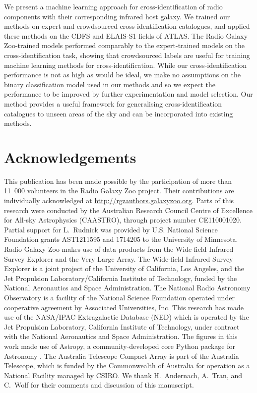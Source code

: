 \documentclass[fleqn,usenatbib,usedcolumn]{mnras}
\begin{document}
  We present a machine learning approach for cross-identification of radio
  components with their corresponding infrared host galaxy. We trained our
  methods on expert and crowdsourced cross-identification catalogues, and
  applied these methods on the CDFS and ELAIS-S1 fields of ATLAS. The Radio
  Galaxy Zoo-trained models performed comparably to the expert-trained models
  on the cross-identification task, showing that crowdsourced labels are
  useful for training machine learning methods for cross-identification. While
  our cross-identification performance is not as high as would be ideal, we
  make no assumptions on the binary classification model used in our methods
  and so we expect the performance to be improved by further experimentation
  and model selection. Our method provides a useful framework for generalising
  cross-identification catalogues to unseen areas of the sky and can be
  incorporated into existing methods.

\section{Acknowledgements}

  This publication has been made possible by the participation of more than 11~000 volunteers in the Radio Galaxy Zoo project. Their contributions are individually acknowledged at \url{http://rgzauthors.galaxyzoo.org}. Parts of this research were conducted by the Australian Research Council Centre of Excellence for All-sky Astrophysics (CAASTRO), through project number CE110001020. Partial support for L.~Rudnick was provided by U.S. National Science Foundation grants AST1211595 and 1714205 to the University of Minnesota. Radio Galaxy Zoo makes use of data products from the Wide-field Infrared Survey Explorer and the Very Large Array. The Wide-field Infrared Survey Explorer is a joint project of the University of California, Los Angeles, and the Jet Propulsion Laboratory/California Institute of Technology, funded by the National Aeronautics and Space Administration. The National Radio Astronomy Observatory is a facility of the National Science Foundation operated under cooperative agreement by Associated Universities, Inc. This research has made use of the NASA/IPAC Extragalactic Database (NED) which is operated by the Jet Propulsion Laboratory, California Institute of Technology, under contract with the National Aeronautics and Space Administration. The figures in this work made use of Astropy, a community-developed core Python package for Astronomy \citep{astropy}. The Australia Telescope Compact Array is part of the Australia Telescope, which is funded by the Commonwealth of Australia for operation as a National Facility managed by CSIRO. We thank H.~Andernach, A.~Tran, and C.~Wolf for their comments and discussion of this manuscript.
\end{document}
